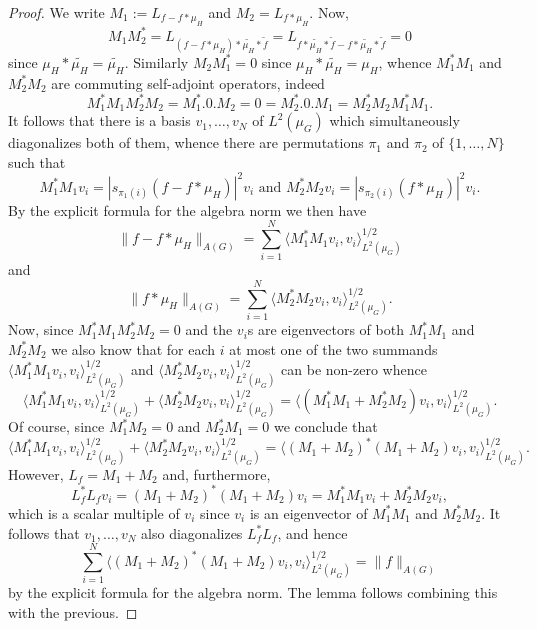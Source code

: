 \documentclass[12pt]{amsart}
\numberwithin{equation}{section}
\theoremstyle{plain}
\theoremstyle{definition}
\begin{document}
\begin{proof}
We write $M_1:=L_{f - f\ast \mu_H}$ and $M_2=L_{f\ast\mu_H}$.  Now, 
\begin{equation*}
M_1M_2^* = L_{(f - f\ast \mu_H)\ast \widetilde{\mu_H}\ast \widetilde{f}} = L_{f \ast \widetilde{\mu_H} \ast \widetilde{f} - f \ast \widetilde{\mu_H} \ast \widetilde{f}} = 0
\end{equation*}
since $\mu_H \ast \widetilde{\mu_H} = \widetilde{\mu_H}$.  Similarly $M_2M_1^*=0$ since $\mu_H\ast \widetilde{\mu_H} = \mu_H$, whence $M_1^*M_1$ and $M_2^*M_2$ are commuting self-adjoint operators, indeed
\begin{equation*}
M_1^*M_1M_2^*M_2 = M_1^*.0.M_2 = 0 = M_2^*.0.M_1 = M_2^*M_2M_1^*M_1.
\end{equation*}
It follows that there is a basis $v_1,\dots,v_N$ of $L^2(\mu_G)$ which simultaneously diagonalizes both of them, whence there are permutations $\pi_1$ and $\pi_2$ of $\{1,\dots,N\}$ such that
\begin{equation*}
M_1^*M_1v_i = |s_{\pi_1(i)}(f-f \ast \mu_H)|^2v_i \textrm{ and } M_2^*M_2v_i = |s_{\pi_2(i)}(f \ast \mu_H)|^2v_i.
\end{equation*}
By the explicit formula for the algebra norm we then have
\begin{equation*}
\|f-f \ast \mu_H\|_{A(G)} = \sum_{i=1}^N{\langle M_1^*M_1v_i,v_i\rangle_{L^2(\mu_G)}^{1/2}}
\end{equation*}
and
\begin{equation*}
\|f \ast \mu_H\|_{A(G)} =  \sum_{i=1}^N{\langle M_2^*M_2v_i,v_i\rangle_{L^2(\mu_G)}^{1/2}}.
\end{equation*}
Now, since $M_1^*M_1M_2^*M_2=0$ and the $v_i$s are eigenvectors of both $M_1^*M_1$ and $M_2^*M_2$ we also know that for each $i$ at most one of the two summands $\langle M_1^*M_1v_i,v_i\rangle_{L^2(\mu_G)}^{1/2}$ and $\langle M_2^*M_2v_i,v_i\rangle_{L^2(\mu_G)}^{1/2}$ can be non-zero whence
\begin{equation*}
\langle M_1^*M_1v_i,v_i\rangle_{L^2(\mu_G)}^{1/2}+\langle M_2^*M_2v_i,v_i\rangle_{L^2(\mu_G)}^{1/2} = \langle (M_1^*M_1+M_2^*M_2)v_i,v_i\rangle_{L^2(\mu_G)}^{1/2}.
\end{equation*}
Of course, since $M_1^*M_2=0$ and $M_2^*M_1=0$ we conclude that
\begin{equation*}
\langle M_1^*M_1v_i,v_i\rangle_{L^2(\mu_G)}^{1/2}+\langle M_2^*M_2v_i,v_i\rangle_{L^2(\mu_G)}^{1/2} = \langle (M_1+M_2)^*(M_1+M_2)v_i,v_i\rangle_{L^2(\mu_G)}^{1/2}.
\end{equation*}
However, $L_f=M_1+M_2$ and, furthermore,
\begin{equation*}
L_f^*L_fv_i = (M_1+M_2)^*(M_1+M_2)v_i = M_1^*M_1v_i + M_2^*M_2v_i,
\end{equation*}
which is a scalar multiple of $v_i$ since $v_i$ is an eigenvector of $M_1^*M_1$ and $M_2^*M_2$. It follows that $v_1,\dots,v_N$ also diagonalizes $L_f^*L_f$, and hence
\begin{equation*}
\sum_{i=1}^N{\langle (M_1+M_2)^*(M_1+M_2)v_i,v_i\rangle_{L^2(\mu_G)}^{1/2}}=\|f\|_{A(G)}
\end{equation*}
by the explicit formula for the algebra norm.  The lemma follows combining this with the previous.
\end{proof}
\end{document}
